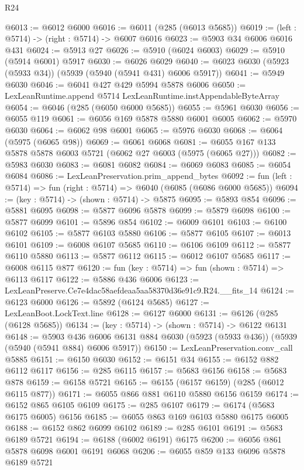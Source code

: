 \begin{lexlean}{R24}
\begin{coremodule}
@6013 := @6012 @6000
@6016 := @6011 (@285 (@6013 @5685))
@6019 := (left : @5714) -> (right : @5714) -> @6007 @6016
@6023 := @5903 @34 @6006 @6016 @431
@6024 := @5913 @27
@6026 := @5910 (@6024 @6003)
@6029 := @5910 (@5914 @6001) @5917
@6030 := @6026 @6029
@6040 := @6023 @6030 (@5923 (@5933 @34)) (@5939 (@5940 (@5941 @431) @6006 @5917))
@6041 := @5949 @6030
@6046 := @6041 @427 @429 @5994 @5878 @6006
@6050 := LexLeanRuntime.append @5714 LexLeanRuntime.instAppendableByteArray
@6054 := @6046 (@285 (@6050 @6000 @5685))
@6055 := @5961 @6030
@6056 := @6055 @119
@6061 := @6056 @169 @5878 @5880 @6001 @6005
@6062 := @5970 @6030
@6064 := @6062 @98 @6001
@6065 := @5976 @6030
@6068 := @6064 (@5975 (@6065 @98))
@6069 := @6061 @6068
@6081 := @6055 @167 @133 @5878 @5878 @6003 @5721 (@6062 @27 @6003 (@5975 (@6065 @27)))
@6082 := @5983 @6030
@6083 := @6081 @6082
@6084 := @6069 @6083
@6085 := @6054 @6084
@6086 := LexLeanPreservation.prim_append_bytes
@6092 := fun (left : @5714) => fun (right : @5714) => @6040 (@6085 (@6086 @6000 @5685))
@6094 := (key : @5714) -> (shown : @5714) -> @5875
@6095 := @5893 @854
@6096 := @5881 @6095
@6098 := @5877 @6096 @5878
@6099 := @5879 @6098
@6100 := @5877 @6099
@6101 := @5896 @854
@6102 := @6009 @6101
@6103 := @6100 @6102
@6105 := @5877 @6103 @5880
@6106 := @5877 @6105
@6107 := @6013 @6101
@6109 := @6008 @6107 @5685
@6110 := @6106 @6109
@6112 := @5877 @6110 @5880
@6113 := @5877 @6112
@6115 := @6012 @6107 @5685
@6117 := @6008 @6115 @877
@6120 := fun (key : @5714) => fun (shown : @5714) => @6113 @6117
@6122 := @5886 @436 @6006
@6123 := LexLeanPreserve.Ce7e4dac58aefdeaa5aa58370d36e91c9.R24.__fits_14
@6124 := @6123 @6000
@6126 := @5892 (@6124 @5685)
@6127 := LexLeanBoot.LockText.line
@6128 := @6127 @6000
@6131 := @6126 (@285 (@6128 @5685))
@6134 := (key : @5714) -> (shown : @5714) -> @6122 @6131
@6148 := @5903
    @436
    @6006
    @6131
    @884
    @6030
    (@5923 (@5933 @436))
    (@5939 (@5940 (@5941 @884) @6006 @5917))
@6150 := LexLeanPreservation.conv_call @5885
@6151 := @6150 @6030
@6152 := @6151 @34
@6155 := @6152 @882 @6112 @6117
@6156 := @285 @6115
@6157 := @5683 @6156
@6158 := @5683 @878
@6159 := @6158 @5721
@6165 := @6155 (@6157 @6159) (@285 (@6012 @6115 @877))
@6171 := @6055 @866 @881 @6110 @5880 @6156 @6159
@6174 := @6152 @865 @6105 @6109
@6175 := @285 @6107
@6179 := @6174 (@5683 @6175 @6005) @6156
@6185 := @6055 @863 @169 @6103 @5880 @6175 @6005
@6188 := @6152 @862 @6099 @6102
@6189 := @285 @6101
@6191 := @5683 @6189 @5721
@6194 := @6188 (@6002 @6191) @6175
@6200 := @6056 @861 @5878 @6098 @6001 @6191 @6068
@6206 := @6055 @859 @133 @6096 @5878 @6189 @5721

\end{coremodule}
\end{lexlean}
